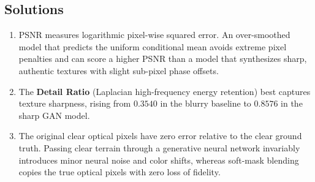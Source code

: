 \subsection*{Solutions}
\begin{enumerate}
    \item PSNR measures logarithmic pixel-wise squared error. An over-smoothed model that predicts the uniform conditional mean avoids extreme pixel penalties and can score a higher PSNR than a model that synthesizes sharp, authentic textures with slight sub-pixel phase offsets.
    \item The \textbf{Detail Ratio} (Laplacian high-frequency energy retention) best captures texture sharpness, rising from $0.3540$ in the blurry baseline to $0.8576$ in the sharp GAN model.
    \item The original clear optical pixels have zero error relative to the clear ground truth. Passing clear terrain through a generative neural network invariably introduces minor neural noise and color shifts, whereas soft-mask blending copies the true optical pixels with zero loss of fidelity.
\end{enumerate}
